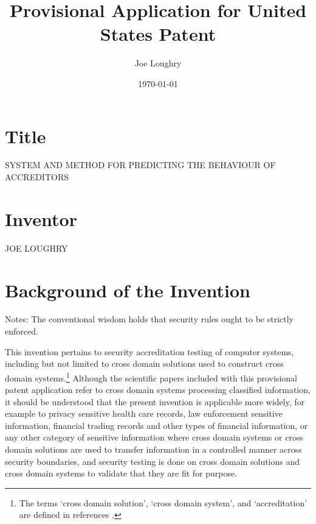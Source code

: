 \documentclass[12pt,letterpaper]{article}
\title{Provisional Application for United States Patent}
\author{Joe Loughry}
\date{\today}
\begin{document}
\maketitle

\section{Title} SYSTEM AND METHOD FOR PREDICTING THE BEHAVIOUR OF ACCREDITORS

\section{Inventor} JOE LOUGHRY

\section{Background of the Invention}


Notes: The conventional wisdom holds that security rules ought to be strictly enforced.


This invention pertains to security accreditation testing of computer systems, including
but not limited to cross domain solutions used to construct cross domain systems.\footnote{The
terms `cross domain solution', `cross domain system', and `accreditation' are defined
in references \cite{Loughry2010a,Loughry2012a,Loughry2012b}.}  Although the
scientific papers included with this provisional patent application refer to cross domain
systems processing classified information, it should be understood that the present invention
is applicable more widely, for example to privacy sensitive health care records, law
enforcement sensitive information, financial trading records and other types of financial
information, or any other category of sensitive information where cross domain systems or
cross domain solutions are used to transfer information in a controlled manner across
security boundaries, and security testing is done on cross domain solutions and cross
domain systems to validate that they are fit for purpose.
\end{document}
